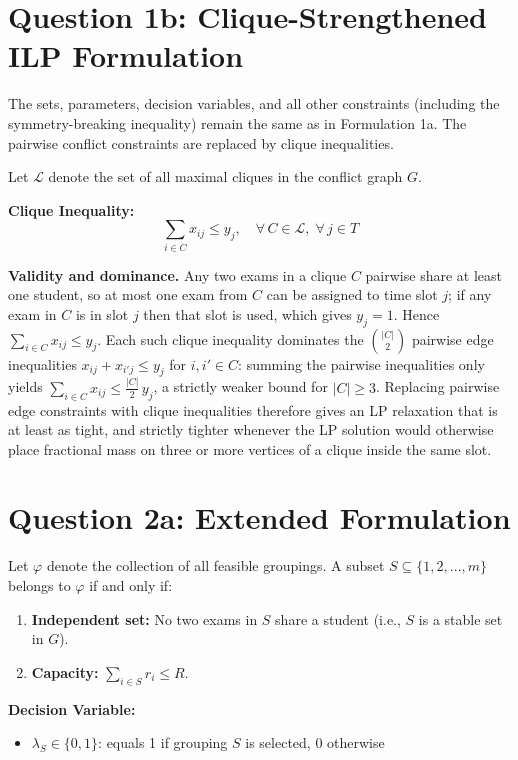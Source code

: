 \documentclass{article}
\begin{document}
\section{Question 1b: Clique-Strengthened ILP Formulation}

The sets, parameters, decision variables, and all other constraints (including the
symmetry-breaking inequality) remain the same as in Formulation 1a. The pairwise
conflict constraints are replaced by clique inequalities.

Let $\mathcal{L}$ denote the set of all maximal cliques in the conflict graph $G$.

\textbf{Clique Inequality:}
\[
\sum_{i \in C} x_{ij} \leq y_j, \quad \forall\, C \in \mathcal{L},\; \forall\, j \in T
\]

\textbf{Validity and dominance.} Any two exams in a clique $C$ pairwise share at least
one student, so at most one exam from $C$ can be assigned to time slot $j$; if any
exam in $C$ is in slot $j$ then that slot is used, which gives $y_j = 1$. Hence
$\sum_{i \in C} x_{ij} \leq y_j$. Each such clique inequality dominates the
$\binom{|C|}{2}$ pairwise edge inequalities $x_{ij} + x_{i'j} \leq y_j$ for
$i, i' \in C$: summing the pairwise inequalities only yields
$\sum_{i \in C} x_{ij} \leq \tfrac{|C|}{2}\, y_j$, a strictly weaker bound for
$|C| \geq 3$. Replacing pairwise edge constraints with clique inequalities therefore
gives an LP relaxation that is at least as tight, and strictly tighter whenever the
LP solution would otherwise place fractional mass on three or more vertices of a
clique inside the same slot.

\section{Question 2a: Extended Formulation}

Let $\varphi$ denote the collection of all feasible groupings. A subset $S \subseteq \{1, 2, \dots, m\}$ belongs to $\varphi$ if and only if:
\begin{enumerate}
    \item \textbf{Independent set:} No two exams in $S$ share a student (i.e., $S$ is a stable set in $G$).
    \item \textbf{Capacity:} $\displaystyle\sum_{i \in S} r_i \leq R$.
\end{enumerate}

\textbf{Decision Variable:}
\begin{itemize}
    \item $\lambda_S \in \{0,1\}$: equals 1 if grouping $S$ is selected, 0 otherwise
\end{itemize}
\end{document}

